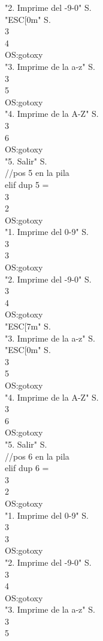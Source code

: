 \documentclass[conference]{IEEEtran}
\begin{document}
\begin{enumerate}
\begin{center}
"2. Imprime del -9-0" S. \\ "ESC[0m" S. \\ 3 \\ 4 \\ OS:gotoxy \\ "3. Imprime de la a-z" S. \\ 3 \\ 5 \\ OS:gotoxy \\ "4. Imprime de la A-Z" S. \\ 3 \\ 6 \\ OS:gotoxy \\ "5. Salir" S. \\ //pos 5 en la pila \\ elif dup 5 = \\ 3 \\ 2 \\ OS:gotoxy \\ "1. Imprime del 0-9" S. \\ 3 \\ 3 \\ OS:gotoxy \\ "2. Imprime del -9-0" S. \\ 3 \\ 4 \\ OS:gotoxy \\ "ESC[7m" S. \\ "3. Imprime de la a-z" S. \\ "ESC[0m" S. \\ 3 \\ 5 \\ OS:gotoxy \\ "4. Imprime de la A-Z" S. \\ 3 \\ 6 \\ OS:gotoxy \\ "5. Salir" S. \\ //pos 6 en la pila \\ elif dup 6 = \\ 3 \\ 2 \\ OS:gotoxy \\ "1. Imprime del 0-9" S. \\ 3 \\ 3 \\ OS:gotoxy \\ "2. Imprime del -9-0" S. \\ 3 \\ 4 \\ OS:gotoxy \\ "3. Imprime de la a-z" S. \\ 3 \\ 5 


\end{center}
\end{enumerate}
\end{document}
